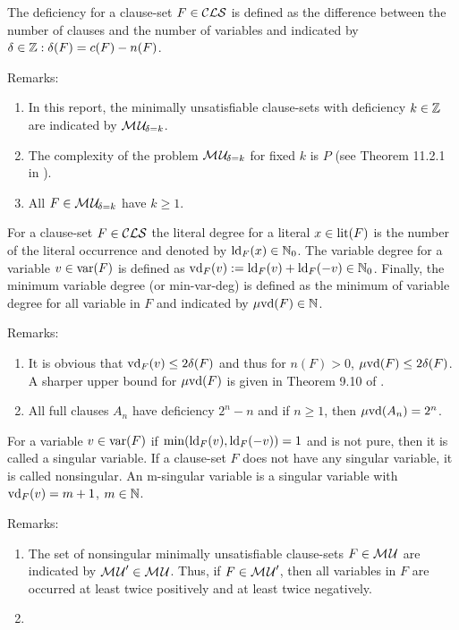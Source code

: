 \documentclass{report}
\begin{document}
\begin{defi}\label{def:deficiency}
The deficiency for a clause-set $F \in \mathcal{CLS}$ is defined as the difference between the number of clauses and the number of variables and indicated by $\delta \in \mathbb{Z}: \delta(F)= c(F) - n(F)$.
\end{defi}
Remarks:
  \begin{enumerate}
  \item In this report, the minimally unsatisfiable clause-sets with deficiency $k \in \mathbb{Z}$ are indicated by $\mathcal{M\hspace{0.8pt}U}_{\!\delta=k}$.
  \item The complexity of the problem $\mathcal{M\hspace{0.8pt}U}_{\!\delta=k}$ for fixed $k$ is $P$ (see Theorem 11.2.1 in \cite{h25}).
  \item All $F \in \mathcal{M\hspace{0.8pt}U}_{\!\delta=k}$ have $k \ge 1$.
  \end{enumerate}

\begin{defi}\label{def:degree}
For a clause-set $F \in \mathcal{CLS}$ the literal degree for a literal $x \in \operatorname{lit}(F)$ is the number of the literal occurrence and denoted by $\operatorname{ld}_F(x) \in \mathbb{N}_0$. The variable degree for a variable $v \in \operatorname{var}(F)$ is defined as $\operatorname{vd}_F(v) := \operatorname{ld}_F(v) + \operatorname{ld}_F(-v) \in \mathbb{N}_0$. Finally, the minimum variable degree (or min-var-deg) is defined as the minimum of variable degree for all variable in $F$ and indicated by $\operatorname{\mu\!\operatorname{vd}}(F) \in \mathbb{N}$.
\end{defi}
Remarks:
  \begin{enumerate}
  \item It is obvious that $\operatorname{vd}_F(v) \le 2 \delta(F)$ and thus for $n(F) >0$, $\operatorname{\mu\!\operatorname{vd}}(F) \le 2 \delta(F)$. A sharper upper bound for $\operatorname{\mu\!\operatorname{vd}}(F)$ is given in Theorem 9.10 of \cite{h9}.
  \item All full clauses $A_n$ have deficiency $2^n - n$ and if $n \ge 1$, then  $\operatorname{\mu\!\operatorname{vd}}(A_n) =2^n$.
    \end{enumerate}
\begin{defi}\label{def:singvar}
For a variable $v \in \operatorname{var}(F)$ if $\min(\operatorname{ld}_F(v) ,\operatorname{ld}_F(-v))=1$ and is not pure, then it is called a singular variable. If a clause-set $F$ does not have any singular variable, it is called nonsingular. An m-singular variable is a singular variable with $\operatorname{vd}_F(v)=m+1$, $m \in \mathbb{N}$.
\end{defi}
Remarks:
  \begin{enumerate}
  \item The set of nonsingular minimally unsatisfiable clause-sets $F \in \mathcal{M\hspace{0.8pt}U}$ are indicated by $\mathcal{M\hspace{0.8pt}U}' \in \mathcal{M\hspace{0.8pt}U}$. Thus, if $F \in \mathcal{M\hspace{0.8pt}U}'$, then all variables in $F$ are occurred at least twice positively and at least twice negatively.
  \item 
   \end{enumerate}
 
\end{document}
